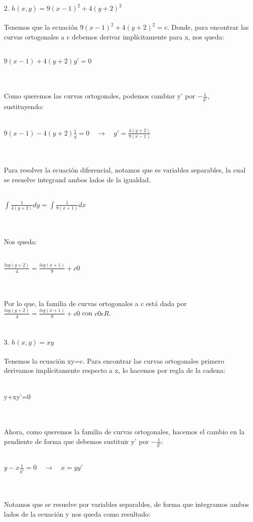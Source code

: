 \documentclass[a4paper,10pt]{article}
\begin{document}
2. $h(x,y)=9(x-1)^2 +4(y+2)^2 $\\\\
Tenemos que la ecuación $9(x-1)^2 +4(y+2)^2 = c$. Donde, para encontrar las curvas ortogonales a c debemos derivar implícitamente para x, nos queda:\\\\
\centerline{$9(x-1) + 4(y+2)y'=0$}\\\\
Como queremos las curvas ortogonales, podemos cambiar y' por $-\frac{1}{y'}$, sustituyendo:\\\\
\centerline{$9(x-1) - 4(y+2)\frac{1}{y}=0\quad \rightarrow \quad y'=\frac{4(y+2)}{9(x-1)}$}\\\\
Para resolver la ecuación diferencial, notamos que es variables separables, la cual se resuelve integrand ambos lados de la igualdad.\\\\
\centerline{$\int \frac{1}{4(y+2)}dy = \int \frac{1}{9(x+1)} dx $}\\\\
Nos queda:\\\\
\centerline{$\frac{log(y+2)}{4} = \frac{log(x+1)}{9} +c0$}\\\\
Por lo que, la familia de curvas ortogonales a c está dada por $\frac{log(y+2)}{4} = \frac{log(x+1)}{9} +c0$ con $c0 \epsilon R$.\\\\\\
3. $h(x,y)=xy$\\\\
Tenemos la ecuación xy=c. Para encontrar las curvas ortogonales primero derivamos implícitamente respecto a x, lo hacemos por regla de la cadena:\\\\
\centerline{y+xy'=0}\\\\
Ahora, como queremos la familia de curvas ortogonales, hacemos el cambio en la pendiente de forma que debemos sustituir y' por $-\frac{1}{y'}$:\\\\
\centerline{$y-x\frac{1}{y'}= 0 \quad\rightarrow\quad x=yy'$}\\\\
Notamos que se resuelve por variables separables, de forma que integramos ambos lados de la ecuación y nos queda como resultado:\\\\
\end{document}
